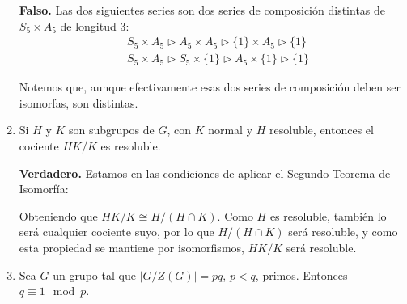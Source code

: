 \documentclass[12pt]{article}
\begin{document}
\begin{ejercicio}[5 puntos]
\begin{enumerate}
                \textbf{Falso.} Las dos siguientes series son dos series de composición distintas de $S_5\times A_5$ de longitud 3:
                \begin{align*}
                    &S_5\times A_5 \rhd A_5\times A_5 \rhd \{1\}\times A_5 \rhd \{1\} \\
                    &S_5\times A_5 \rhd S_5\times \{1\} \rhd A_5\times \{1\} \rhd \{1\}
                \end{align*}

                Notemos que, aunque efectivamente esas dos series de composición deben ser isomorfas, son distintas.
            \item Si $H$ y $K$ son subgrupos de $G$, con $K$ normal y $H$ resoluble, entonces el cociente $HK/K$ es resoluble.

                \textbf{Verdadero.} Estamos en las condiciones de aplicar el Segundo Teorema de Isomorfía:
                \begin{figure}[H]
                    \centering
                \end{figure}
                Obteniendo que $HK/K \cong H/(H\cap K)$. Como $H$ es resoluble, también lo será cualquier cociente suyo, por lo que $H/(H\cap K)$ será resoluble, y como esta propiedad se mantiene por isomorfismos, $HK/K$ será resoluble.
            \item Sea $G$ un grupo tal que $|G/Z(G)| = pq$, $p<q$, primos. Entonces $q\equiv 1 \mod p$.


\end{enumerate}
\end{ejercicio}
\end{document}

